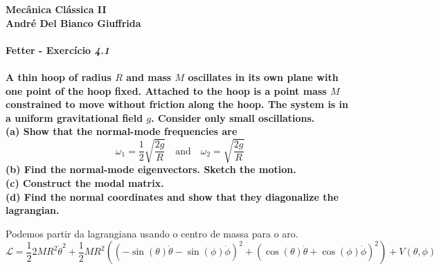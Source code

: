 \documentclass[a4paper,11pt]{exam}
\begin{document}
\begingroup
	  \bf \Large Mecânica Clássica II\\
	  \indent \normalsize André Del Bianco Giuffrida
	\endgroup
	\\ \quad
	\\
	\large{Fetter - Exercício \emph{4.1}}
	\\
	\\
	A thin hoop of radius $R$ and mass $M$ oscillates in its own plane with one point of the hoop fixed. Attached to the hoop is a point mass $M$
constrained to move without friction along the hoop. The system is in a uniform gravitational field $g$. Consider only small oscillations.\\

	\indent (a) Show that the normal-mode frequencies are \[\omega_1 = \frac{1}{2}\sqrt{\frac{2g}{R}}  \quad \text{and} \quad \omega_2 = \sqrt{\frac{2g}{R}}\]
	\indent (b) Find the normal-mode eigenvectors. Sketch the motion.\\
	\indent (c) Construct the modal matrix.\\
	\indent (d) Find the normal coordinates and show that they diagonalize the lagrangian.
	\\
	\normalsize
	\begin{figure}[!h]
	\centering
	\end{figure}
	Podemos partir da lagrangiana usando o centro de massa para o aro.
	\[\mathcal{L} = \frac{1}{2} 2MR^2\dot\theta^2 + \frac{1}{2} MR^2((-\sin(\theta)\dot\theta-\sin(\phi)\dot\phi)^2 + (\cos(\theta)\dot\theta+\cos(\phi)\dot\phi)^2) + V(\theta,\phi)\]
	
\end{document}
